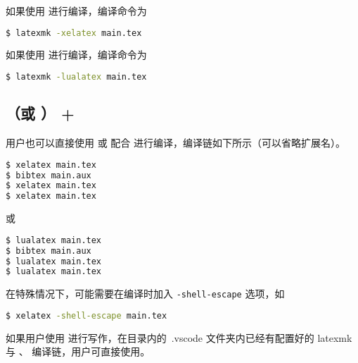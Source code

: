 如果使用  进行编译，编译命令为
\lstset{basicstyle=\ttfamily, breaklines=true}
\begin{lstlisting}[language=bash]
$ latexmk -xelatex main.tex
\end{lstlisting}

如果使用  进行编译，编译命令为
\lstset{basicstyle=\ttfamily, breaklines=true}
\begin{lstlisting}[language=bash]
$ latexmk -lualatex main.tex
\end{lstlisting}

\subsection{（或 ） + }
用户也可以直接使用  或  配合  进行编译，编译链如下所示（可以省略扩展名）。
\begin{lstlisting}[language=bash]
$ xelatex main.tex  
$ bibtex main.aux
$ xelatex main.tex
$ xelatex main.tex
\end{lstlisting}
或
\begin{lstlisting}[language=bash]
$ lualatex main.tex  
$ bibtex main.aux
$ lualatex main.tex
$ lualatex main.tex
\end{lstlisting}

在特殊情况下，可能需要在编译时加入 \verb|-shell-escape| 选项，如
\begin{lstlisting}[language=bash]
$ xelatex -shell-escape main.tex 
\end{lstlisting}

如果用户使用  进行写作，在目录内的\ .vscode 文件夹内已经有配置好的 latexmk 与 、 编译链，用户可直接使用。